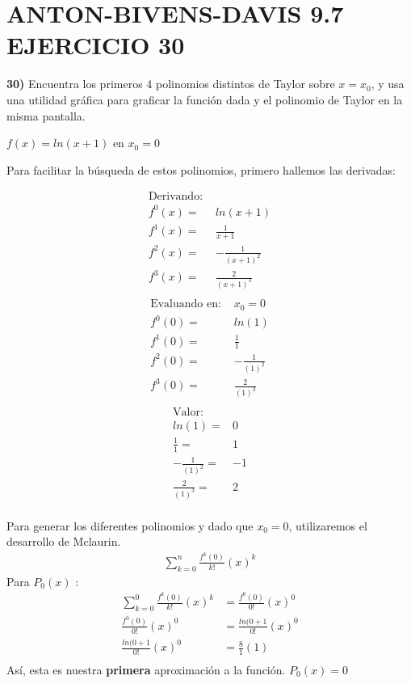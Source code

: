 \chapter*{ANTON-BIVENS-DAVIS 9.7 EJERCICIO 30}
\textbf{30)} Encuentra los primeros 4 polinomios distintos de Taylor sobre $x = x_{0}$, y usa una utilidad gráfica para graficar la función dada y el polinomio de Taylor en la misma pantalla. \\
\begin{center}
   $f(x) = ln(x+1)$ en $  x_{0}= 0$
\end{center}
Para facilitar la búsqueda de estos polinomios, primero hallemos las derivadas:
\begin{multicols}{3}
	\noindent
	\begin{align*}
		\text{Derivando: } &        \\
		f^{0}(x) =& ln(x+1) \\
        f^{1}(x) =& \frac{1}{x+1} \\
        f^{2}(x) =& -\frac{1}{(x+1)^{2}} \\
        f^{3}(x) =& \frac{2}{(x+1)^{3}} \\
	\end{align*}
	\columnbreak
	\begin{align*}
		\text{Evaluando en: }& x_{0} = 0     \\
		f^{0}(0) =& ln(1) \\
        f^{1}(0) =& \frac{1}{1} \\
        f^{2}(0) =& -\frac{1}{(1)^{2}} \\
        f^{3}(0) =& \frac{2}{(1)^{3}} \\
	\end{align*}
	\columnbreak
	\begin{align*}
		\text{Valor: }&      \\
        ln(1)              =& 0 \\
        \frac{1}{1}        =& 1 \\
        -\frac{1}{(1)^{2}} =&-1 \\
        \frac{2}{(1)^{3}}  =& 2 \\
	\end{align*}
\end{multicols}
Para generar los diferentes polinomios y dado que $x_{0} = 0$, utilizaremos el desarrollo de Mclaurin.
\begin{align*}
   \sum_{k=0}^{n} \frac{f^{k}(0)}{k!}(x)^{k}
\end{align*}
Para $P_{0}(x)$ :
\begin{align*}
   \sum_{k=0}^{0} \frac{f^{k}(0)}{k!}(x)^{k} &= \frac{f^{0}(0)}{0!}(x)^{0} \\
   \frac{f^{0}(0)}{0!}(x)^{0} &= \frac{ln(0+1}{0!}(x)^{0}\\
   \frac{ln(0+1}{0!}(x)^{0} &= \frac{8}{1}(1)\\
\end{align*}
Así, esta es nuestra \textbf{primera} aproximación a la función. $P_{0}(x) = 0$ \\

